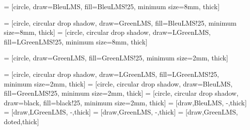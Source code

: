  = [circle, draw=BleuLMS, fill=BleuLMS!25, minimum size=8mm, thick]

 = [circle, circular drop shadow, draw=GreenLMS, fill=BleuLMS!25, minimum size=8mm, thick]
 = [circle, circular drop shadow, draw=LGreenLMS, fill=LGreenLMS!25, minimum size=8mm, thick]

 = [circle, draw=GreenLMS, fill=GreenLMS!25, minimum size=2mm, thick]

 = [circle, circular drop shadow, draw=LGreenLMS, fill=LGreenLMS!25, minimum size=2mm, thick]
 = [circle, circular drop shadow, draw=BleuLMS, fill=GreenLMS!25, minimum size=2mm, thick]
 = [circle, circular drop shadow, draw=black, fill=black!25, minimum size=2mm, thick]
 = [draw,BleuLMS, -,thick]
 = [draw,LGreenLMS, -,thick]
 = [draw,GreenLMS, -,thick]
 = [draw,GreenLMS, doted,thick]
\usetikzlibrary {math}
\usetikzlibrary {decorations}
\usetikzlibrary{shadows}



